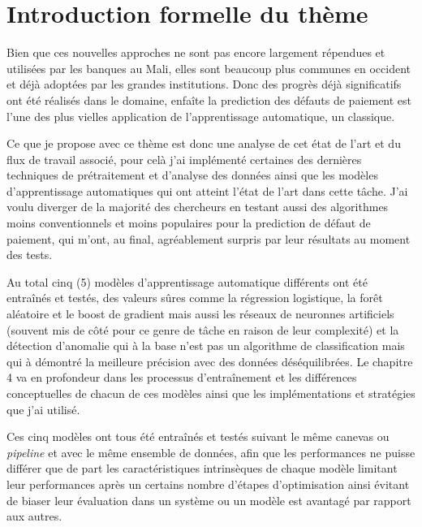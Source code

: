 \section{Introduction formelle du thème}
\label{chap1.section3}
Bien que ces nouvelles approches ne sont pas encore largement répendues et utilisées par les banques au Mali, elles sont beaucoup plus communes en occident et déjà adoptées par les grandes institutions. Donc des progrès déjà significatifs ont été réalisés dans le domaine, enfaîte la prediction des défauts de paiement est l'une des plus vielles application de l'apprentissage automatique, un classique.

Ce que je propose avec ce thème est donc une analyse de cet état de l'art et du flux de travail associé, pour celà j'ai implémenté certaines des dernières techniques de prétraitement et d'analyse des données ainsi que les modèles d'apprentissage automatiques qui ont atteint l'état de l'art dans cette tâche. J'ai voulu diverger de la majorité des chercheurs en testant aussi des algorithmes moins conventionnels et moins populaires pour la prediction de défaut de paiement, qui m'ont, au final, agréablement surpris par leur résultats au moment des tests.

Au total cinq (5) modèles d'apprentissage automatique différents ont été entraînés et testés, des valeurs sûres comme la régression logistique, la forêt aléatoire et le boost de gradient mais aussi les réseaux de neuronnes artificiels (souvent mis de côté pour ce genre de tâche en raison de leur complexité) et la détection d'anomalie qui à la base n'est pas un algorithme de classification mais qui à démontré la meilleure précision avec des données déséquilibrées. Le chapitre 4 va en profondeur dans les processus d'entraînement et les différences conceptuelles de chacun de ces modèles ainsi que les implémentations et stratégies que j'ai utilisé.

Ces cinq modèles ont tous été entraînés et testés suivant le même canevas ou \textit{pipeline} et avec le même ensemble de données, afin que les performances ne puisse différer que de part les caractéristiques intrinsèques de chaque modèle limitant leur performances après un certains nombre d'étapes d'optimisation ainsi évitant de biaser leur évaluation dans un système ou un modèle est avantagé par rapport aux autres.

